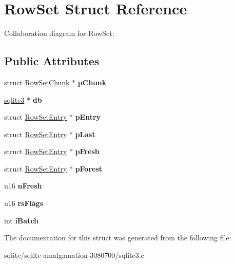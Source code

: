 \hypertarget{struct_row_set}{\section{Row\+Set Struct Reference}
\label{struct_row_set}
}


Collaboration diagram for Row\+Set\+:
\subsection*{Public Attributes}
\begin{DoxyCompactItemize}
\item 
\hypertarget{struct_row_set_af064f9ec7b1ba820a3d53622bde9d42f}{struct \hyperlink{struct_row_set_chunk}{Row\+Set\+Chunk} $\ast$ {\bfseries p\+Chunk}}\label{struct_row_set_af064f9ec7b1ba820a3d53622bde9d42f}

\item 
\hypertarget{struct_row_set_a7da847a06c2f90025fbd89c57516c6f6}{\hyperlink{structsqlite3}{sqlite3} $\ast$ {\bfseries db}}\label{struct_row_set_a7da847a06c2f90025fbd89c57516c6f6}

\item 
\hypertarget{struct_row_set_a3eccaf69ad7863abae2541a7c0b94e1d}{struct \hyperlink{struct_row_set_entry}{Row\+Set\+Entry} $\ast$ {\bfseries p\+Entry}}\label{struct_row_set_a3eccaf69ad7863abae2541a7c0b94e1d}

\item 
\hypertarget{struct_row_set_a040c4b798e6f20d20aa99a45e93b2079}{struct \hyperlink{struct_row_set_entry}{Row\+Set\+Entry} $\ast$ {\bfseries p\+Last}}\label{struct_row_set_a040c4b798e6f20d20aa99a45e93b2079}

\item 
\hypertarget{struct_row_set_a7c4e95bd08ff77135068bb3987be5ca1}{struct \hyperlink{struct_row_set_entry}{Row\+Set\+Entry} $\ast$ {\bfseries p\+Fresh}}\label{struct_row_set_a7c4e95bd08ff77135068bb3987be5ca1}

\item 
\hypertarget{struct_row_set_abe7ab16fffbe5992f637d6a17c6342ff}{struct \hyperlink{struct_row_set_entry}{Row\+Set\+Entry} $\ast$ {\bfseries p\+Forest}}\label{struct_row_set_abe7ab16fffbe5992f637d6a17c6342ff}

\item 
\hypertarget{struct_row_set_a0ed2a47d6789a70081f3454ef2604e7f}{u16 {\bfseries n\+Fresh}}\label{struct_row_set_a0ed2a47d6789a70081f3454ef2604e7f}

\item 
\hypertarget{struct_row_set_abfbd103e329e88d0a09ca5a7c9bbd225}{u16 {\bfseries rs\+Flags}}\label{struct_row_set_abfbd103e329e88d0a09ca5a7c9bbd225}

\item 
\hypertarget{struct_row_set_a90ebc79619b880c1a38b96622ad0ffe0}{int {\bfseries i\+Batch}}\label{struct_row_set_a90ebc79619b880c1a38b96622ad0ffe0}

\end{DoxyCompactItemize}


The documentation for this struct was generated from the following file\+:\begin{DoxyCompactItemize}
\item 
sqlite/sqlite-\/amalgamation-\/3080700/sqlite3.\+c\end{DoxyCompactItemize}
